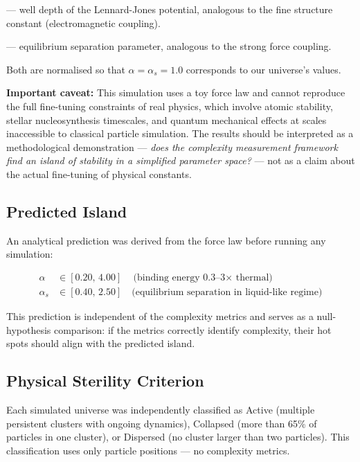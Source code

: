 \documentclass[12pt,a4paper]{article}
\begin{document}
\begin{description}[noitemsep]
  \item[$\alpha$] — well depth of the Lennard-Jones potential, analogous
    to the fine structure constant (electromagnetic coupling).
  \item[$\alpha_s$] — equilibrium separation parameter, analogous to
    the strong force coupling.
\end{description}

Both are normalised so that $\alpha = \alpha_s = 1.0$ corresponds to
our universe's values.

\textbf{Important caveat:} This simulation uses a toy force law and
cannot reproduce the full fine-tuning constraints of real physics,
which involve atomic stability, stellar nucleosynthesis timescales,
and quantum mechanical effects at scales inaccessible to classical
particle simulation.
The results should be interpreted as a methodological demonstration —
\emph{does the complexity measurement framework find an island of
stability in a simplified parameter space?} — not as a claim about
the actual fine-tuning of physical constants.

\subsection{Predicted Island}

An analytical prediction was derived from the force law before running
any simulation:

\begin{align}
\alpha   &\in [0.20,\, 4.00] \quad \text{(binding energy 0.3--3$\times$ thermal)} \\
\alpha_s &\in [0.40,\, 2.50] \quad \text{(equilibrium separation in liquid-like regime)}
\end{align}

This prediction is independent of the complexity metrics and serves
as a null-hypothesis comparison: if the metrics correctly identify
complexity, their hot spots should align with the predicted island.

\subsection{Physical Sterility Criterion}

Each simulated universe was independently classified as Active
(multiple persistent clusters with ongoing dynamics), Collapsed
(more than 65\% of particles in one cluster), or Dispersed
(no cluster larger than two particles).
This classification uses only particle positions — no complexity metrics.
\end{document}
